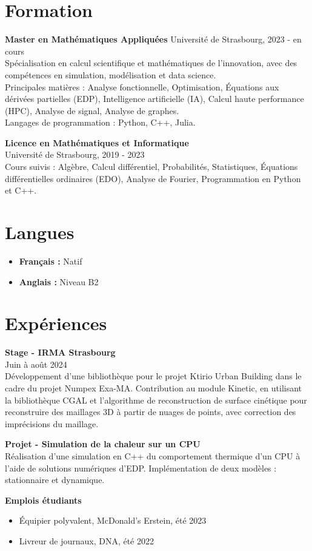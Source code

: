 \documentclass[a4paper,10pt]{article}
\begin{document}
\vspace{1cm}  %

\section*{Formation}
\textbf{Master en Mathématiques Appliquées} 
Université de Strasbourg, 2023 - en cours \\
Spécialisation en calcul scientifique et mathématiques de l'innovation, avec des compétences en simulation, modélisation et data science. \\
Principales matières : Analyse fonctionnelle, Optimisation, Équations aux dérivées partielles (EDP), Intelligence artificielle (IA), Calcul haute performance (HPC), Analyse de signal, Analyse de graphes. \\
Langages de programmation : Python, C++, Julia.

\noindent
\textbf{Licence en Mathématiques et Informatique} \\
Université de Strasbourg, 2019 - 2023 \\
Cours suivis : Algèbre, Calcul différentiel, Probabilités, Statistiques, Équations différentielles ordinaires (EDO), Analyse de Fourier, Programmation en Python et C++.

\section*{Langues}
\begin{itemize}[label={}]
    \item \textbf{Français :} Natif
    \item \textbf{Anglais :} Niveau B2
\end{itemize}

\section*{Expériences}
\noindent
\textbf{Stage - IRMA Strasbourg} \\
Juin à août 2024 \\
Développement d'une bibliothèque pour le projet Ktirio Urban Building dans le cadre du projet Numpex Exa-MA. Contribution au module Kinetic, en utilisant la bibliothèque CGAL et l'algorithme de reconstruction de surface cinétique pour reconstruire des maillages 3D à partir de nuages de points, avec correction des imprécisions du maillage.

\noindent
\textbf{Projet - Simulation de la chaleur sur un CPU} \\
Réalisation d'une simulation en C++ du comportement thermique d'un CPU à l'aide de solutions numériques d'EDP. Implémentation de deux modèles : stationnaire et dynamique.


\noindent
\textbf{Emplois étudiants}
\begin{itemize}
    \item Équipier polyvalent, McDonald's Erstein, été 2023
    \item Livreur de journaux, DNA, été 2022
\end{itemize}
\end{document}
